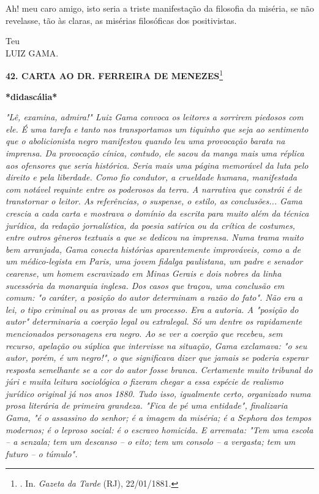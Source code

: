 Ah! meu caro amigo, isto seria a triste manifestação da filosofia da
miséria, se não revelasse, tão às claras, as misérias filosóficas dos
positivistas.

Teu\\
LUIZ GAMA.

\textbf{42. CARTA AO DR. FERREIRA DE MENEZES}\footnote{. In.
  \emph{Gazeta da Tarde} (RJ), 22/01/1881.}

\textbf{*didascália*}

\emph{"Lê, examina, admira!" Luiz Gama convoca os leitores a sorrirem
piedosos com ele. É uma tarefa e tanto nos transportamos um tiquinho que
seja ao sentimento que o abolicionista negro manifestou quando leu uma
provocação barata na imprensa. Da provocação cínica, contudo, ele sacou
da manga mais uma réplica aos ofensores que seria histórica. Seria mais
uma página memorável da luta pelo direito e pela liberdade. Como fio
condutor, a crueldade humana, manifestada com notável requinte entre os
poderosos da terra. A narrativa que constrói é de transtornar o leitor.
As referências, o suspense, o estilo, as conclusões... Gama crescia a
cada carta e mostrava o domínio da escrita para muito além da técnica
jurídica, da redação jornalística, da poesia satírica ou da crítica de
costumes, entre outros gêneros textuais a que se dedicou na imprensa.
Numa trama muito bem arranjada, Gama conecta histórias aparentemente
improváveis, como a de um médico-legista em Paris, uma jovem fidalga
paulistana, um padre e senador cearense, um homem escravizado em Minas
Gerais e dois nobres da linha sucessória da monarquia inglesa. Dos casos
que traçou, uma conclusão em comum: "o caráter, a posição do autor
determinam a razão do fato". Não era a lei, o tipo criminal ou as provas
de um processo. Era a autoria. A "posição do autor" determinaria a
coerção legal ou extralegal. Só um dentre os rapidamente mencionados
personagens era negro. Ao se ver a coerção que recebeu, sem recurso,
apelação ou súplica que intervisse na situação, Gama exclamava: "o seu
autor, porém, é um negro!", o que significava dizer que jamais se
poderia esperar resposta semelhante se a cor do autor fosse branca.
Certamente muito tribunal do júri e muita leitura sociológica o fizeram
chegar a essa espécie de realismo jurídico original já nos anos 1880.
Tudo isso, igualmente certo, organizado numa prosa literária de primeira
grandeza. "Fica de pé uma entidade", finalizaria Gama, "é o assassino do
senhor; é a imagem da miséria; é a Sephora dos tempos modernos; é o
leproso social: é o escravo homicida. E arremata: "Tem uma escola -- a
senzala; tem um descanso -- o eito; tem um consolo -- a vergasta; tem um
futuro -- o túmulo". }

